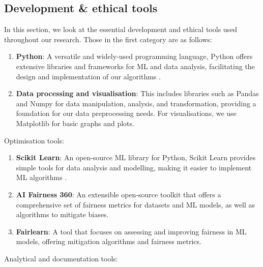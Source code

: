 \documentclass[twoside,11pt]{article}
\begin{document}
\subsection{Development \& ethical tools}

In this section, we look at the essential development and ethical tools used throughout our research. Those in the first category are as follows:

\begin{enumerate}
    \item \textbf{Python}: A versatile and widely-used programming language, Python offers extensive libraries and frameworks for ML and data analysis, facilitating the design and implementation of our algorithms .
    
    \item \textbf{Data processing and visualisation}: This includes libraries such as Pandas  and Numpy  for data manipulation, analysis, and transformation, providing a foundation for our data preprocessing needs. For visualisations, we use Matplotlib  for basic graphs and plots.
\end{enumerate}

Optimisation tools:

\begin{enumerate}
    \item \textbf{Scikit Learn}: An open-source ML library for Python, Scikit Learn provides simple tools for data analysis and modelling, making it easier to implement ML algorithms .
    
    \item \textbf{AI Fairness 360}: An extensible open-source toolkit that offers a comprehensive set of fairness metrics for datasets and ML models, as well as algorithms to mitigate biases.
    
    \item \textbf{Fairlearn}: A tool that focuses on assessing and improving fairness in ML models, offering mitigation algorithms and fairness metrics.
\end{enumerate}

Analytical and documentation tools:
\end{document}
